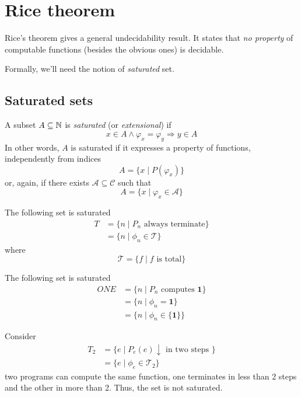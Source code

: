 \chapter {Rice theorem}

Rice's theorem gives a general undecidability result. It states that \emph{no property} of computable functions
(besides the obvious ones) is decidable.

Formally, we'll need the notion of \emph{saturated} set.
\section{Saturated sets}
\begin{definition}
  A subset $A \subseteq \mathbb{N}$ is \emph{saturated} (or \emph{extensional}) if
  \[
     x \in A \wedge \varphi_x = \varphi_y \Rightarrow y \in A 
  \]
  In other words, $A$ is saturated if it expresses a property of
functions, independently from indices
\[A = \{x \mid P(\varphi_x)\}\]
or, again, if there exists $\mathcal{A} \subseteq \mathcal{C}$ such that
\[A = \{ x \mid \varphi_x \in \mathcal{A}\}\]
\end{definition}

\begin{example}
  The following set is saturated
  \begin{align*}
    T &= \{ n \mid P_n \mbox{ always terminate} \} \\
    &= \{n \mid \phi_n \in \mathcal{T} \}
  \end{align*}
  where
  \[ \mathcal{T} = \{ f \mid f \mbox{ is total} \} \]
\end{example}

\begin{example}
  The following set is saturated
  \begin{align*}
    ONE &= \{ n \mid P_n \mbox{ computes } \mathbf{1}\} \\
    &= \{n \mid \phi_n = \mathbf{1} \} \\
    &= \{n \mid \phi_n \in \{ \mathbf{1} \} \}
  \end{align*}
\end{example}

\begin{example}
  Consider
  \begin{align*}
    T_2 &= \{ e \mid P_e(e)\downarrow \mbox{ in two steps } \} \\
    &=
    \{e \mid \phi_e \in \mathcal{T}_2 \}
  \end{align*}
  two programs can compute the same function, one terminates in
  less than 2 steps and the other in more than 2. Thus, the set is not
  saturated.
\end{example}

